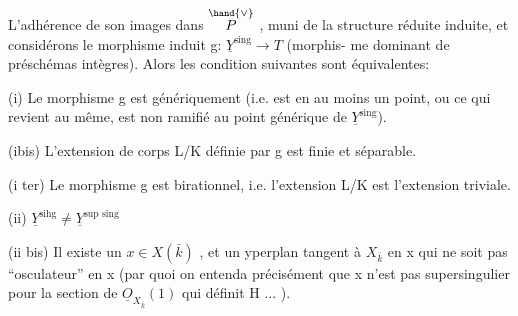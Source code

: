 
L'adhérence de son images dans $\overset{\hand{\vee}}{P}$ , muni de la structure réduite
induite, et considérons le morphisme induit g: $\underline{Y}^{\text{sing}} \longrightarrow T$  (morphis-%
me dominant de préschémas  intègres). Alors les condition
 suivantes sont équivalentes:

(i) Le morphisme g est génériquement   (i.e. est   en au moins un point, ou ce qui revient au même, est  non ramifié
au point générique de $\underline{Y}^{\text{sing}}$).

(ibis) L'extension de corps L/K définie par g est finie et
séparable.

(i ter) Le morphisme g est birationnel, i.e. l'extension L/K est
l'extension triviale.

(ii) $\underline{Y}^{\text{sihg}} \neq \underline{Y}^{\text{sup sing}}$ 

(ii bis) Il existe un $x \in X(\bar{k})$ , et un yperplan tangent  à $X_{\bar{k}}$
en x qui ne soit pas ``osculateur'' en x (par quoi on entenda précisément
que x n'est pas supersingulier pour la section de $\underline{O}_{X_{\bar{k}}}(1)$ qui définit
H ... ).

